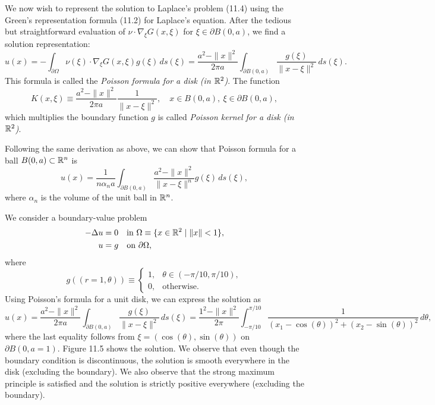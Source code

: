We now wish to represent the solution to Laplace's problem (11.4) using the Green's representation formula (11.2) for Laplace's equation. After the tedious but straightforward evaluation of $\nu \cdot \nabla_\xi G(x, \xi)$ for $\xi \in \partial B(0, a)$, we find a solution representation:
\[u(x) = -\int_{\partial\Omega} \nu(\xi) \cdot \nabla_\xi G(x, \xi)g(\xi)\,ds(\xi) = \frac{a^2 - \|x\|^2}{2\pi a}\int_{\partial B(0, a)} \frac{g(\xi)}{\|x - \xi\|^2}\,ds(\xi).\]
This formula is called the \textit{Poisson formula for a disk (in $\mathbb{R}^2$)}. The function
\[K(x, \xi) \equiv \frac{a^2 - \|x\|^2}{2\pi a}\frac{1}{\|x - \xi\|^2}, \quad x \in B(0, a), \ \xi \in \partial B(0, a),\]
which multiplies the boundary function $g$ is called \textit{Poisson kernel for a disk (in $\mathbb{R}^2$)}.

\begin{nremark}
    Following the same derivation as above, we can show that Poisson formula for a ball $B(0, a) \subset \mathbb{R}^n$ is
    \[u(x) = \frac{1}{n\alpha_na}\int_{\partial B(0, a)} \frac{a^2 - \|x\|^2}{\|x - \xi\|^n}g(\xi)\,ds(\xi),\]
    where $\alpha_n$ is the volume of the unit ball in $\mathbb{R}^n$.
\end{nremark}

\begin{example}
    We consider a boundary-value problem
    \begin{align*}
        -\Delta u &= 0 \quad \text{in } \Omega \equiv \{x \in \mathbb{R}^2 \mid \|x\| < 1\}, \\
        u &= g \quad \text{on } \partial\Omega,
    \end{align*}
    where
    \[g((r = 1, \theta)) \equiv \begin{cases} 1, & \theta \in (-\pi/10, \pi/10), \\ 0, & \text{otherwise}. \end{cases}\]
    Using Poisson's formula for a unit disk, we can express the solution as
    \[u(x) = \frac{a^2 - \|x\|^2}{2\pi a}\int_{\partial B(0, a)} \frac{g(\xi)}{\|x - \xi\|^2}\,ds(\xi) = \frac{1^2 - \|x\|^2}{2\pi}\int_{-\pi/10}^{\pi/10} \frac{1}{(x_1 - \cos(\theta))^2 + (x_2 - \sin(\theta))^2}\,d\theta,\]
    where the last equality follows from $\xi = (\cos(\theta), \sin(\theta))$ on $\partial B(0, a = 1)$. Figure 11.5 shows the solution. We observe that even though the boundary condition is discontinuous, the solution is smooth everywhere in the disk (excluding the boundary). We also observe that the strong maximum principle is satisfied and the solution is strictly positive everywhere (excluding the boundary).

\end{example}

